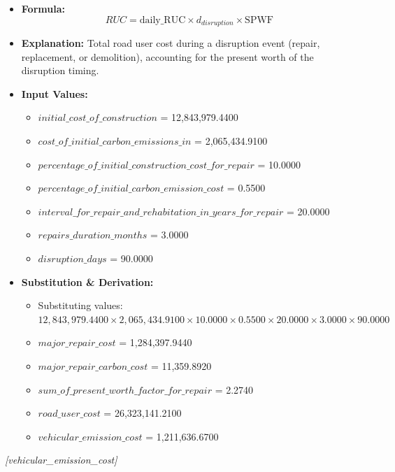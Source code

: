 \documentclass[12pt,a4paper]{article}
\begin{document}
\begin{itemize}
  \item \textbf{Formula:} $$RUC = \text{daily\_RUC} \times d_{disruption} \times \text{SPWF}$$
  \item \textbf{Explanation:} Total road user cost during a disruption event (repair, replacement, or demolition), accounting for the present worth of the disruption timing.
  \item \textbf{Input Values:}
  \begin{itemize}
    \item $initial\_cost\_of\_construction$ = 12,843,979.4400
    \item $cost\_of\_initial\_carbon\_emissions\_in$ = 2,065,434.9100
    \item $percentage\_of\_initial\_construction\_cost\_for\_repair$ = 10.0000
    \item $percentage\_of\_initial\_carbon\_emission\_cost$ = 0.5500
    \item $interval\_for\_repair\_and\_rehabitation\_in\_years\_for\_repair$ = 20.0000
    \item $repairs\_duration\_months$ = 3.0000
    \item $disruption\_days$ = 90.0000
  \end{itemize}
  \item \textbf{Substitution \& Derivation:}
  \begin{itemize}
    \item Substituting values: $12,843,979.4400 \times 2,065,434.9100 \times 10.0000 \times 0.5500 \times 20.0000 \times 3.0000 \times 90.0000$
    \item $major\_repair\_cost$ = 1,284,397.9440
    \item $major\_repair\_carbon\_cost$ = 11,359.8920
    \item $sum\_of\_present\_worth\_factor\_for\_repair$ = 2.2740
    \item $road\_user\_cost$ = 26,323,141.2100
    \item $vehicular\_emission\_cost$ = 1,211,636.6700
  \end{itemize}
\end{itemize}


\textit{[vehicular\_emission\_cost]}
\end{document}
